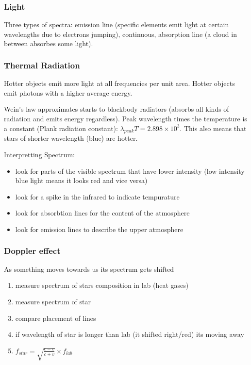\documentclass[12pt]{article}
\begin{document}
\subsubsection{Light}
Three types of spectra: emission line (specific elements emit light at certain wavelengths due to electrons jumping), continuous, absorption line (a cloud in between absorbes some light).

\subsubsection{Thermal Radiation}
 Hotter objects emit more light at all frequencies per unit area. Hotter objects emit photons with a higher average energy.

Wein's law approximates starts to blackbody radiators (absorbs all kinds of radiation and emits energy regardless). Peak wavelength times the temperature is a constant (Plank radiation constant): $\lambda_{peak}T = 2.898\times10^3$. This also means that stars of shorter wavelength (blue) are hotter.

Interpretting Spectrum:
\begin{itemize}
    \item look for parts of the visible spectrum that have lower intensity (low intensity blue light means it looks red and vice versa)
    \item look for a spike in the infrared to indicate tempurature
    \item look for absorbtion lines for the content of the atmosphere
    \item look for emission lines to describe the upper atmosphere
\end{itemize}

\subsubsection{Doppler effect}
As something moves towards us its spectrum gets shifted
\begin{enumerate}
    \item measure spectrum of stars composition in lab (heat gases)
    \item measure spectrum of star
    \item compare placement of lines
    \item if wavelength of star is longer than lab (it shifted right/red) its moving away
    \item $f_{star} = \sqrt{\frac{c-v}{c+v}} \times f_{lab}$
\end{enumerate}
\end{document}
